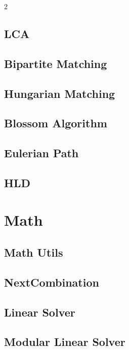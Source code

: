 \documentclass[10pt, a4paper]{article}
\begin{document}
\begin{landscape}
\begin{multicols}{2}
\subsection{LCA}
\raggedbottom
\subsection{Bipartite Matching}
\raggedbottom
\subsection{Hungarian Matching}
\raggedbottom
\subsection{Blossom Algorithm}
\raggedbottom
\subsection{Eulerian Path}
\raggedbottom
\subsection{HLD}
\raggedbottom

\section{Math}
\subsection{Math Utils}
\raggedbottom
\subsection{NextCombination}
\raggedbottom
\subsection{Linear Solver}
\raggedbottom
\subsection{Modular Linear Solver}
\raggedbottom

\end{multicols}
\end{landscape}
\end{document}
